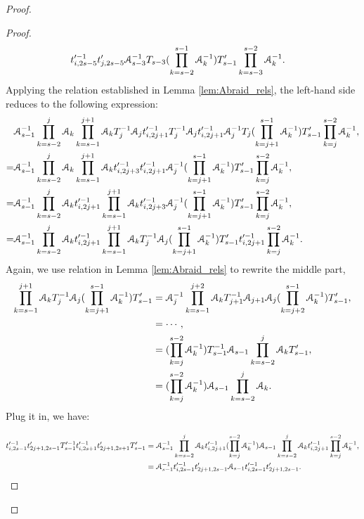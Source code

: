 \documentclass{amsart}
\begin{document}
\begin{proof}
\begin{proof}
\begin{align*}
 &t'^{-1}_{i,2s-5}t'_{j,2s-5}\AA^{-1}_{s-3}T_{s-3}(\prod_{k=s-2}^{s-1}\AA^{-1}_{k})T'_{s-1}\prod^{s-2}_{k=s-3}\AA^{-1}_{k}.
\end{align*}
Applying the relation established in Lemma \ref{lem:Abraid_rels}, the left-hand side reduces to the following expression:
\[
\begin{aligned}
 &\AA^{-1}_{s-1}\prod^{j}_{k=s-2}\AA_{k}\prod^{j+1}_{k=s-1}\AA_{k}T^{-1}_{j}\AA_{j}t'^{-1}_{i,2j+1}T^{-1}_{j}\AA_{j}
 t'^{-1}_{i,2j+1}\AA^{-1}_{j}T_{j}(\prod_{k=j+1}^{s-1}\AA^{-1}_{k})T'_{s-1}\prod^{s-2}_{k=j}\AA^{-1}_{k},\\
 =&\AA^{-1}_{s-1}\prod^{j}_{k=s-2}\AA_{k}\prod^{j+1}_{k=s-1}\AA_{k}t'^{-1}_{i,2j+3}
 t'^{-1}_{i,2j+1}\AA^{-1}_{j}(\prod_{k=j+1}^{s-1}\AA^{-1}_{k})T'_{s-1}\prod^{s-2}_{k=j}\AA^{-1}_{k},\\
 =&\AA^{-1}_{s-1}\prod^{j}_{k=s-2}\AA_{k}t'^{-1}_{i,2j+1}\prod^{j+1}_{k=s-1}\AA_{k}t'^{-1}_{i,2j+3}
 \AA^{-1}_{j}(\prod_{k=j+1}^{s-1}\AA^{-1}_{k})T'_{s-1}\prod^{s-2}_{k=j}\AA^{-1}_{k},\\
 =&\AA^{-1}_{s-1}\prod^{j}_{k=s-2}\AA_{k}t'^{-1}_{i,2j+1}\prod^{j+1}_{k=s-1}\AA_{k}T_j^{-1}\AA_{j}
 (\prod_{k=j+1}^{s-1}\AA^{-1}_{k})T'_{s-1}t'^{-1}_{i,2j+1}\prod^{s-2}_{k=j}\AA^{-1}_{k}.
\end{aligned}
\]
Again, we use relation in Lemma \ref{lem:Abraid_rels} to rewrite the middle part,
\[
\begin{aligned}
\prod^{j+1}_{k=s-1}\AA_{k}T_j^{-1}\AA_{j}
 (\prod_{k=j+1}^{s-1}\AA^{-1}_{k})T'_{s-1}&=\AA^{-1}_{j}\prod^{j+2}_{k=s-1}\AA_{k}T_{j+1}^{-1}\AA_{j+1}\AA_{j}
 (\prod_{k=j+2}^{s-1}\AA^{-1}_{k})T'_{s-1},\\
 &=\cdots,\\
 &=(\prod_{k=j}^{s-2}\AA^{-1}_{k})T^{-1}_{s-1}\AA_{s-1}\prod^{j}_{k=s-2}\AA_{k}T'_{s-1},\\
 &=(\prod_{k=j}^{s-2}\AA^{-1}_{k})\AA_{s-1}\prod^{j}_{k=s-2}\AA_{k}.
\end{aligned}
\]
Plug it in, we have:

\begin{align*}
 t'^{-1}_{i,2s-1}t'_{2j+1,2s-1}T'^{-1}_{s-1}t'^{-1}_{i,2s+1}t'_{2j+1,2s+1}T'_{s-1}&=\AA^{-1}_{s-1}\prod^{j}_{k=s-2}\AA_{k}t'^{-1}_{i,2j+1}(\prod_{k=j}^{s-2}\AA^{-1}_{k})\AA_{s-1}\prod^{j}_{k=s-2}\AA_{k}t'^{-1}_{i,2j+1}\prod^{s-2}_{k=j}\AA^{-1}_{k},\\
 &=\AA^{-1}_{s-1}t'^{-1}_{i,2s-1}t'_{2j+1,2s-1}\AA_{s-1}t'^{-1}_{i,2s-1}t'_{2j+1,2s-1}.
\end{align*}


\end{proof}
\end{proof}
\end{document}
